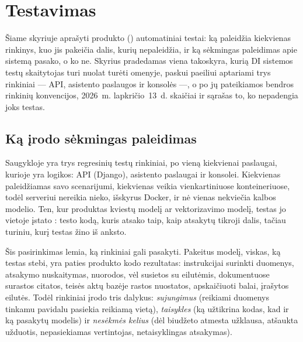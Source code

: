 \chapter{Testavimas}\label{ch:testing}

Šiame skyriuje aprašyti produkto (\product{}) automatiniai testai: ką paleidžia kiekvienas rinkinys, kuo jis
pakeičia dalis, kurių nepaleidžia, ir ką sėkmingas paleidimas apie sistemą pasako, o ko ne.
Skyrius pradedamas viena takoskyra, kurią DI sistemos testų skaitytojas turi nuolat turėti
omenyje, paskui paeiliui aptariami trys rinkiniai --- API, asistento paslaugos ir konsolės ---, o
po jų pateikiamos bendros rinkinių konvencijos, 2026~m.
lapkričio~13~d. skaičiai ir sąrašas to, ko nepadengia joks testas.


\section{Ką įrodo sėkmingas paleidimas}\label{sec:testing:principle}

Saugykloje yra trys regresinių testų rinkiniai, po vieną kiekvienai paslaugai, kurioje yra
logikos: API (Django), asistento paslaugai ir konsolei. Kiekvienas paleidžiamas savo
scenarijumi, kiekvienas veikia vienkartiniuose konteineriuose, todėl serveriui nereikia nieko,
išskyrus Docker, ir nė vienas nekviečia kalbos modelio. Ten, kur produktas kviestų modelį ar
vektorizavimo modelį, testas jo vietoje įstato : testo kodą, kuris atsako taip,
kaip atsakytų tikroji dalis, tačiau turiniu, kurį testas žino iš anksto.

Šis pasirinkimas lemia, ką rinkiniai gali pasakyti. Pakeitus modelį, viskas, ką testas stebi,
yra paties produkto kodo rezultatas: instrukcijai surinkti duomenys, atsakymo nuskaitymas,
nuorodos, vėl susietos su eilutėmis, dokumentuose surastos citatos, teisės aktų bazėje rastos
nuostatos, apskaičiuoti balai, įrašytos eilutės. Todėl rinkiniai įrodo tris dalykus:
\emph{sujungimus} (reikiami duomenys tinkamu pavidalu pasiekia reikiamą vietą), \emph{taisykles}
(ką užtikrina kodas, kad ir ką pasakytų modelis) ir \emph{nesėkmės kelius} (dėl biudžeto atmesta užklausa,
atšaukta užduotis, nepasiekiamas vertintojas, netaisyklingas atsakymas).

